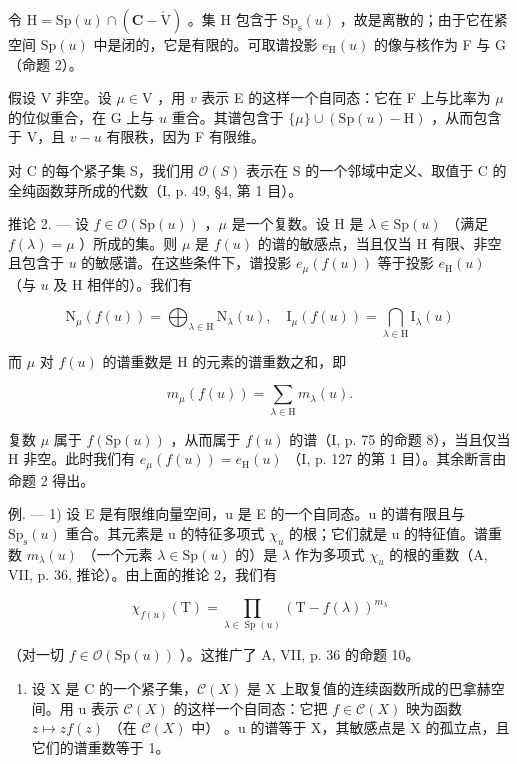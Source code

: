 令 \(\mathrm{H} = \mathrm{Sp}(u) \cap (\mathbf{C} - \mathring{\mathrm{V}})\) 。集 H 包含于 \(\mathrm{Sp}_{\mathrm{s}}(u)\) ，故是离散的；由于它在紧空间 \(\mathrm{Sp}(u)\) 中是闭的，它是有限的。可取谱投影 \(e_{\mathrm{H}}(u)\) 的像与核作为 F 与 G（命题 2）。

假设 V 非空。设 \(\mu\in\mathrm{V}\) ，用 \(v\) 表示 E 的这样一个自同态：它在 F 上与比率为 \(\mu\) 的位似重合，在 G 上与 \(u\) 重合。其谱包含于 \(\{\mu\}\cup(\mathrm{Sp}(u)-\mathrm{H})\) ，从而包含于 V，且 \(v-u\) 有限秩，因为 F 有限维。

对 C 的每个紧子集 S，我们用 \(\mathcal{O}(S)\) 表示在 S 的一个邻域中定义、取值于 C 的全纯函数芽所成的代数（I, p. 49, §4, 第 1 目）。

推论 2. --- 设 \(f \in \mathcal{O}(\mathrm{Sp}(u))\) ，\(\mu\) 是一个复数。设 H 是 \(\lambda \in \mathrm{Sp}(u)\) （满足 \(f(\lambda) = \mu\) ）所成的集。则 \(\mu\) 是 \(f(u)\) 的谱的敏感点，当且仅当 H 有限、非空且包含于 \(u\) 的敏感谱。在这些条件下，谱投影 \(e_{\mu}(f(u))\) 等于投影 \(e_{\mathrm{H}}(u)\) （与 \(u\) 及 H 相伴的）。我们有

\[
\mathrm{N} _ {\mu} (f (u)) = \bigoplus_ {\lambda \in \mathrm{H}} \mathrm{N} _ {\lambda} (u), \quad \mathrm{I} _ {\mu} (f (u)) = \bigcap_ {\lambda \in \mathrm{H}} \mathrm{I} _ {\lambda} (u)
\]

而 \(\mu\) 对 \(f(u)\) 的谱重数是 H 的元素的谱重数之和，即

\[
m _ {\mu} (f (u)) = \sum_ {\lambda \in \mathrm{H}} m _ {\lambda} (u).
\]

复数 \(\mu\) 属于 \(f(\mathrm{Sp}(u))\) ，从而属于 \(f(u)\) 的谱（I, p. 75 的命题 8），当且仅当 H 非空。此时我们有 \(e_{\mu}(f(u)) = e_{\mathrm{H}}(u)\) （I, p. 127 的第 1 目）。其余断言由命题 2 得出。

例. --- 1) 设 E 是有限维向量空间，u 是 E 的一个自同态。u 的谱有限且与 \(\mathrm{Sp}_{\mathrm{s}}(u)\) 重合。其元素是 u 的特征多项式 \(\chi_{u}\) 的根；它们就是 u 的特征值。谱重数 \(m_{\lambda}(u)\) （一个元素 \(\lambda \in \mathrm{Sp}(u)\) 的）是 \(\lambda\) 作为多项式 \(\chi_{u}\) 的根的重数（A, VII, p. 36, 推论）。由上面的推论 2，我们有

\[
\chi_ {f (u)} (\mathrm{T}) = \prod_ {\lambda \in \operatorname{Sp} (u)} (\mathrm{T} - f (\lambda)) ^ {m _ {\lambda}}
\]

（对一切 \(f \in \mathcal{O}(\mathrm{Sp}(u))\) ）。这推广了 A, VII, p. 36 的命题 10。

\begin{enumerate}
\def\labelenumi{\arabic{enumi})}
\setcounter{enumi}{1}
\tightlist
\item
  设 X 是 C 的一个紧子集，\(\mathcal{C}(X)\) 是 X 上取复值的连续函数所成的巴拿赫空间。用 u 表示 \(\mathcal{C}(X)\) 的这样一个自同态：它把 \(f \in \mathcal{C}(X)\) 映为函数 \(z \mapsto zf(z)\) （在 \(\mathcal{C}(X)\) 中） 。u 的谱等于 X，其敏感点是 X 的孤立点，且它们的谱重数等于 1。
\end{enumerate}

